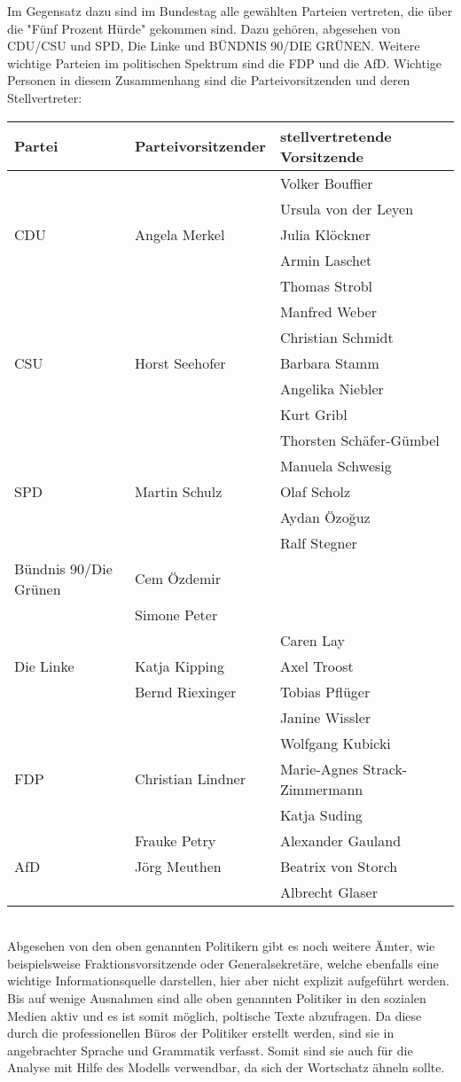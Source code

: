Im Gegensatz dazu sind im Bundestag alle gewählten Parteien vertreten, die über die "Fünf Prozent Hürde" gekommen sind. Dazu gehören, abgesehen von CDU/CSU und SPD, Die Linke und BÜNDNIS 90/DIE GRÜNEN. Weitere wichtige Parteien im politischen Spektrum sind die FDP und die AfD. Wichtige Personen in diesem Zusammenhang sind die Parteivorsitzenden und deren Stellvertreter: \\
\begin{tabular}{lll}
\hline
Partei & Parteivorsitzender & stellvertretende Vorsitzende \\
\hline
& & Volker Bouffier \\
& & Ursula von der Leyen \\
CDU & Angela Merkel & Julia Klöckner \\
& & Armin Laschet\\
& & Thomas Strobl \\
\hline
& & Manfred Weber \\
& & Christian Schmidt \\
CSU & Horst Seehofer &  Barbara Stamm \\
& & Angelika Niebler\\
& & Kurt Gribl \\
\hline
& & Thorsten Schäfer-Gümbel \\
& & Manuela Schwesig \\
SPD & Martin Schulz & Olaf Scholz\\
& & Aydan Özoğuz\\
& & Ralf Stegner \\
\hline
Bündnis 90/Die Grünen & Cem Özdemir \\
& Simone Peter & \\
\hline
& & Caren Lay \\
Die Linke & Katja Kipping & Axel Troost\\
& Bernd Riexinger & Tobias Pflüger \\
& & Janine Wissler \\
\hline
& & Wolfgang Kubicki \\
FDP & Christian Lindner & Marie-Agnes Strack-Zimmermann\\
& & Katja Suding \\
\hline
& Frauke Petry & Alexander Gauland \\
AfD & Jörg Meuthen & Beatrix von Storch \\
& & Albrecht Glaser \\
\hline
\end{tabular} \\
Abgesehen von den oben genannten Politikern gibt es noch weitere Ämter, wie beispielsweise Fraktionsvorsitzende oder Generalsekretäre, welche ebenfalls eine wichtige Informationsquelle darstellen, hier aber nicht explizit aufgeführt werden. Bis auf wenige Ausnahmen sind alle oben genannten Politiker in den sozialen Medien aktiv und es ist somit möglich, poltische Texte abzufragen. Da diese durch die professionellen Büros der Politiker erstellt werden, sind sie in angebrachter Sprache und Grammatik verfasst. Somit sind sie auch für die Analyse mit Hilfe des Modells verwendbar, da sich der Wortschatz ähneln sollte.

